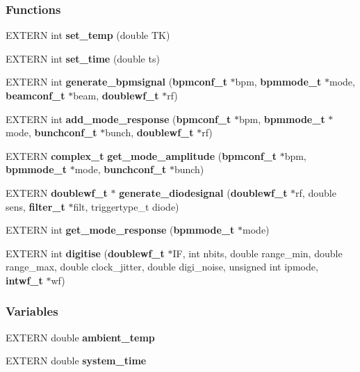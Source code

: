 \subsubsection*{Functions}
\begin{CompactItemize}
\item 
EXTERN int {\bf set\_\-temp} (double TK)
\item 
EXTERN int {\bf set\_\-time} (double ts)
\item 
EXTERN int {\bf generate\_\-bpmsignal} ({\bf bpmconf\_\-t} $\ast$bpm, {\bf bpmmode\_\-t} $\ast$mode, {\bf beamconf\_\-t} $\ast$beam, {\bf doublewf\_\-t} $\ast$rf)
\item 
EXTERN int {\bf add\_\-mode\_\-response} ({\bf bpmconf\_\-t} $\ast$bpm, {\bf bpmmode\_\-t} $\ast$mode, {\bf bunchconf\_\-t} $\ast$bunch, {\bf doublewf\_\-t} $\ast$rf)
\item 
EXTERN {\bf complex\_\-t} {\bf get\_\-mode\_\-amplitude} ({\bf bpmconf\_\-t} $\ast$bpm, {\bf bpmmode\_\-t} $\ast$mode, {\bf bunchconf\_\-t} $\ast$bunch)
\item 
EXTERN {\bf doublewf\_\-t} $\ast$ {\bf generate\_\-diodesignal} ({\bf doublewf\_\-t} $\ast$rf, double sens, {\bf filter\_\-t} $\ast$filt, triggertype\_\-t diode)
\item 
EXTERN int {\bf get\_\-mode\_\-response} ({\bf bpmmode\_\-t} $\ast$mode)
\item 
EXTERN int {\bf digitise} ({\bf doublewf\_\-t} $\ast$IF, int nbits, double range\_\-min, double range\_\-max, double clock\_\-jitter, double digi\_\-noise, unsigned int ipmode, {\bf intwf\_\-t} $\ast$wf)
\end{CompactItemize}
\subsubsection*{Variables}
\begin{CompactItemize}
\item 
EXTERN double {\bf ambient\_\-temp}
\item 
EXTERN double {\bf system\_\-time}
\end{CompactItemize}
